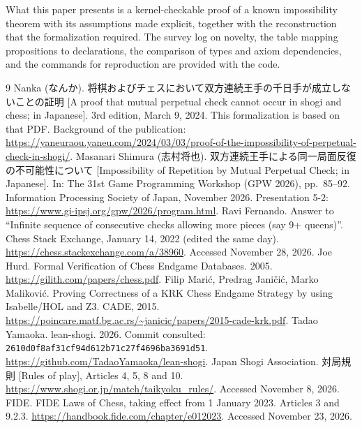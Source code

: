 \documentclass[a4paper,11pt]{article}
\theoremstyle{definition}
\begin{document}
What this paper presents is a kernel-checkable proof of a known impossibility theorem with its assumptions made explicit, together with the reconstruction that the formalization required.
The survey log on novelty, the table mapping propositions to declarations, the comparison of types and axiom dependencies, and the commands for reproduction are provided with the code.

\begin{thebibliography}{9}
Nanka (なんか). 将棋およびチェスにおいて双方連続王手の千日手が成立しないことの証明 [A proof that mutual perpetual check cannot occur in shogi and chess; in Japanese]. 3rd edition, March 9, 2024. This formalization is based on that PDF. Background of the publication: \url{https://yaneuraou.yaneu.com/2024/03/03/proof-of-the-impossibility-of-perpetual-check-in-shogi/}.
Masanari Shimura (志村将也). 双方連続王手による同一局面反復の不可能性について [Impossibility of Repetition by Mutual Perpetual Check; in Japanese]. In: The 31st Game Programming Workshop (GPW 2026), pp.~85--92. Information Processing Society of Japan, November 2026. Presentation 5-2: \url{https://www.gi-ipsj.org/gpw/2026/program.html}.
Ravi Fernando. Answer to ``Infinite sequence of consecutive checks allowing more pieces (say 9+ queens)''. Chess Stack Exchange, January 14, 2022 (edited the same day). \url{https://chess.stackexchange.com/a/38960}. Accessed November 28, 2026.
Joe Hurd. Formal Verification of Chess Endgame Databases. 2005. \url{https://gilith.com/papers/chess.pdf}.
Filip Marić, Predrag Janičić, Marko Maliković. Proving Correctness of a KRK Chess Endgame Strategy by using Isabelle/HOL and Z3. CADE, 2015. \url{https://poincare.matf.bg.ac.rs/~janicic/papers/2015-cade-krk.pdf}.
Tadao Yamaoka. lean-shogi. 2026. Commit consulted: \nolinkurl{2610d0f8af31cf94d612b71c27f4696ba3691d51}. \url{https://github.com/TadaoYamaoka/lean-shogi}.
Japan Shogi Association. 対局規則 [Rules of play], Articles 4, 5, 8 and 10. \url{https://www.shogi.or.jp/match/taikyoku_rules/}. Accessed November 8, 2026.
FIDE. FIDE Laws of Chess, taking effect from 1 January 2023. Articles 3 and 9.2.3. \url{https://handbook.fide.com/chapter/e012023}. Accessed November 23, 2026.
\end{thebibliography}
\end{document}
